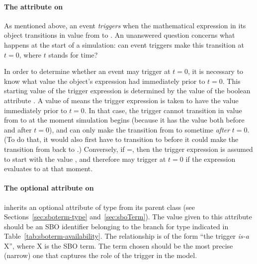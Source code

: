 \paragraph{The  attribute on \Trigger}
\label{sec:trigger-initialvalue}

As mentioned above, an event \emph{triggers} when the mathematical
expression in its \Trigger object transitions in value from
 to .  An unanswered question concerns what
happens at the start of a simulation: can event triggers make this
transition at $t = 0$, where $t$ stands for time?

In order to determine whether an event may trigger at $t = 0$, it is
necessary to know what value the \Trigger object's 
expression had immediately prior to $t = 0$.  This starting value
of the trigger expression is determined by the value of the
boolean attribute .  A value of 
means the trigger expression is taken to have the value 
immediately prior to $t = 0$.  In that case, the trigger cannot
transition in value from  to  at the moment
simulation begins (because it has the value  both before
and after $t = 0$), and can only make the transition from
 to  sometime \emph{after} $t = 0$.  (To do
that, it would also first have to transition to  before
it could make the transition from  back to .)
Conversely, if =, then the trigger
expression is assumed to start with the value , and
therefore may trigger at $t = 0$ if the expression evaluates to
 at that moment.

%


\paragraph{The optional  attribute on \Trigger}
\label{sec:trigger-sboterm}

\Trigger inherits an optional  attribute of type
 from its parent class \SBase (see
Sections~\ref{sec:sboterm-type} and~\ref{sec:sboTerm}).  The value
given to this attribute should be an SBO identifier belonging to
the branch for type \Trigger indicated in
Table~\ref{tab:sboterm-availability}.  The relationship is of the
form ``the trigger \emph{is-a} X'', where X is the SBO term.  The
term chosen should be the most precise (narrow) one that captures
the role of the trigger in the model.

